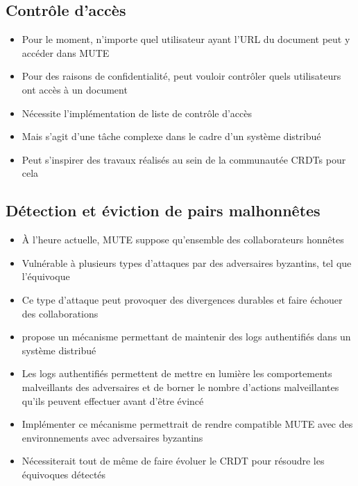 \documentclass[12pt]{thesul}
\begin{document}
\subsection{Contrôle d'accès}

\begin{itemize}
  \item Pour le moment, n'importe quel utilisateur ayant l'URL du document peut y accéder dans MUTE
  \item Pour des raisons de confidentialité, peut vouloir contrôler quels utilisateurs ont accès à un document
  \item Nécessite l'implémentation de liste de contrôle d'accès
  \item Mais s'agit d'une tâche complexe dans le cadre d'un système distribué
  \item Peut s'inspirer des travaux réalisés au sein de la communautée \acp{CRDT} \cite{2021-access-control-crdts, 2022-dist-access-control-pa} pour cela
\end{itemize}

\subsection{Détection et éviction de pairs malhonnêtes}

\begin{itemize}
  \item À l'heure actuelle, MUTE suppose qu'ensemble des collaborateurs honnêtes
  \item Vulnérable à plusieurs types d'attaques par des adversaires byzantins, tel que l'équivoque
  \item Ce type d'attaque peut provoquer des divergences durables et faire échouer des collaborations
  \item \textcite{2021-these-vic} propose un mécanisme permettant de maintenir des logs authentifiés dans un système distribué
  \item Les logs authentifiés permettent de mettre en lumière les comportements malveillants des adversaires et de borner le nombre d'actions malveillantes qu'ils peuvent effectuer avant d'être évincé
  \item Implémenter ce mécanisme permettrait de rendre compatible MUTE avec des environnements avec adversaires byzantins
  \item Nécessiterait tout de même de faire évoluer le \ac{CRDT} pour résoudre les équivoques détectés
\end{itemize}
\end{document}
